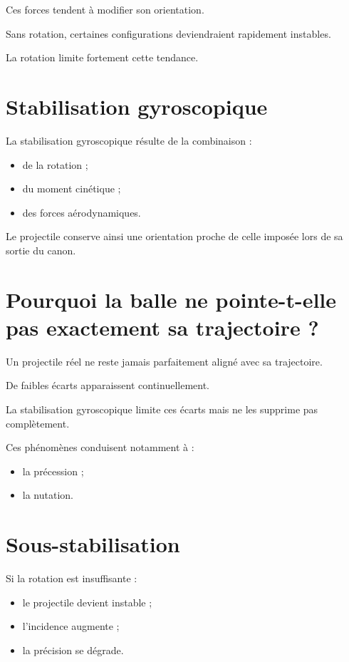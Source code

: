 Ces forces tendent à modifier son orientation.

Sans rotation, certaines configurations deviendraient rapidement instables.

La rotation limite fortement cette tendance.

\section{Stabilisation gyroscopique}

La stabilisation gyroscopique résulte de la combinaison :

\begin{itemize}
    \item de la rotation ;
    \item du moment cinétique ;
    \item des forces aérodynamiques.
\end{itemize}

Le projectile conserve ainsi une orientation proche de celle imposée lors de
sa sortie du canon.

\section{Pourquoi la balle ne pointe-t-elle pas exactement sa trajectoire ?}

Un projectile réel ne reste jamais parfaitement aligné avec sa trajectoire.

De faibles écarts apparaissent continuellement.

La stabilisation gyroscopique limite ces écarts mais ne les supprime pas
complètement.

Ces phénomènes conduisent notamment à :

\begin{itemize}
    \item la précession ;
    \item la nutation.
\end{itemize}

\section{Sous-stabilisation}

Si la rotation est insuffisante :

\begin{itemize}
    \item le projectile devient instable ;
    \item l'incidence augmente ;
    \item la précision se dégrade.
\end{itemize}


